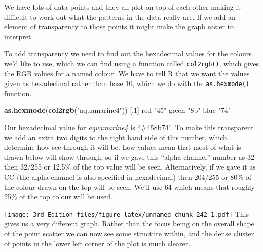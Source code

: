 \documentclass[
]{book}
\newenvironment{Shaded}{\begin{snugshade}}{\end{snugshade}}
\newcommand{\DataTypeTok}[1]{\textcolor[rgb]{0.13,0.29,0.53}{#1}}
\newcommand{\DecValTok}[1]{\textcolor[rgb]{0.00,0.00,0.81}{#1}}
\newcommand{\KeywordTok}[1]{\textcolor[rgb]{0.13,0.29,0.53}{\textbf{#1}}}
\newcommand{\NormalTok}[1]{#1}
\newcommand{\OperatorTok}[1]{\textcolor[rgb]{0.81,0.36,0.00}{\textbf{#1}}}
\newcommand{\StringTok}[1]{\textcolor[rgb]{0.31,0.60,0.02}{#1}}
\begin{document}
We have lots of data points and they all plot on top of each other making it difficult to work out what the patterns in the data really are. If we add an element of transparency to those points it might make the graph easier to interpret.

To add transparency we need to find out the hexadecimal values for the colours we'd like to use, which we can find using a function called \texttt{col2rgb()}, which gives the RGB values for a named colour. We have to tell R that we want the values given as hexadecimal rather than base 10, which we do with the \texttt{as.hexmode()} function.

\begin{Shaded}
\begin{Highlighting}[]
\KeywordTok{as.hexmode}\NormalTok{(}\KeywordTok{col2rgb}\NormalTok{(}\StringTok{"aquamarine4"}\NormalTok{))}
\NormalTok{      [,}\DecValTok{1}\NormalTok{]}
\NormalTok{red   }\StringTok{"45"}
\NormalTok{green }\StringTok{"8b"}
\NormalTok{blue  }\StringTok{"74"}
\end{Highlighting}
\end{Shaded}

Our hexadecimal value for \emph{aquamarine4} is ``\#458b74''. To make this transparent we add an extra two digits to the right hand side of this number, which determine how see-through it will be. Low values mean that most of what is drawn below will show through, so if we gave this ``alpha channel'' number as 32 then 32/255 or 12.5\% of the top value will be seen. Alternatively, if we gave it as CC (the alpha channel is also specified in hexadecimal) then 204/255 or 80\% of the colour drawn on the top will be seen. We'll use 64 which means that roughly 25\% of the top colour will be used.

\begin{Shaded}
\end{Shaded}

\texttt{[image: 3rd\_Edition\_files/figure-latex/unnamed-chunk-242-1.pdf]}
This gives us a very different graph. Rather than the focus being on the overall shape of the point scatter we can now see some structure within, and the dense cluster of points in the lower left corner of the plot is much clearer.
\end{document}
